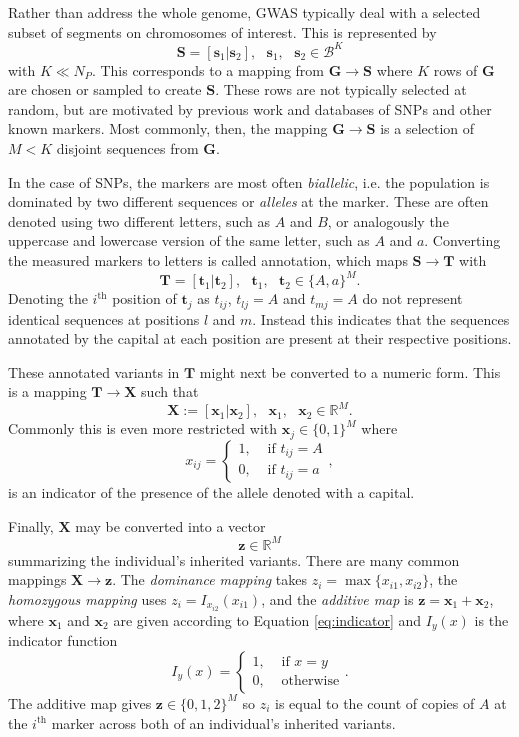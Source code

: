 \documentclass{article}
\newcommand{\ve}[1]{\mathbf{#1}}           %
\newcommand{\m}[1]{\mathbf{#1}}               %
\newcommand{\ind}[2]{I_{#2} \left( #1 \right)}
\newcommand{\field}[1]{\mathbb{#1}}
\newcommand{\Reals}{\field{R}}
\begin{document}
Rather than address the whole genome, GWAS typically deal with a selected subset of segments on chromosomes of interest. This is represented by
$$\m{S} = [\ve{s}_1 | \ve{s}_2], \text{ } \ve{s}_1, \text{ } \ve{s}_2 \in \mathcal{B}^K$$
with $K \ll N_P$. This corresponds to a mapping from $\m{G} \rightarrow \m{S}$ where $K$ rows of $\m{G}$ are chosen or sampled to create $\m{S}$. These rows are not typically selected at random, but are motivated by previous work and databases of SNPs and other known markers. Most commonly, then, the mapping $\m{G} \rightarrow \m{S}$ is a selection of $M < K$ disjoint sequences from $\m{G}$. 

In the case of SNPs, the markers are most often \textit{biallelic}, i.e. the population is dominated by two different sequences or \textit{alleles} at the marker. These are often denoted using two different letters, such as $A$ and $B$, or analogously the uppercase and lowercase version of the same letter, such as $A$ and $a$. Converting the measured markers to letters is called annotation, which maps $\m{S} \rightarrow \m{T}$ with
$$\m{T} = [\ve{t}_1 | \ve{t}_2], \text{ } \ve{t}_1, \text{ } \ve{t}_2 \in \{A,a\}^M.$$
Denoting the $i^{\text{th}}$ position of $\ve{t}_j$ as $t_{ij}$, $t_{lj} = A$ and $t_{mj} = A$ do not represent identical sequences at positions $l$ and $m$. Instead this indicates that the sequences annotated by the capital at each position are present at their respective positions.

These annotated variants in $\m{T}$ might next be converted to a numeric form. This is a mapping $\m{T} \rightarrow \m{X}$ such that
$$\m{X} := [\ve{x}_1 | \ve{x}_2], \text{ } \ve{x}_1, \text{ } \ve{x}_2 \in \Reals^M.$$
Commonly this is even more restricted with $\ve{x}_j \in \{0,1\}^M$ where
\begin{equation} \label{eq:indicator}
x_{ij} = \begin{cases}
  1, & \text{ if } t_{ij} = A \\
  0, & \text{ if } t_{ij} = a
\end{cases},
\end{equation}
is an indicator of the presence of the allele denoted with a capital.

Finally, $\m{X}$ may be converted into a vector
$$\ve{z} \in \Reals^M$$
summarizing the individual's inherited variants. There are many common mappings $\m{X} \rightarrow \ve{z}$. The \textit{dominance mapping} takes $z_i = \max\{x_{i1}, x_{i2}\}$, the \textit{homozygous mapping} uses $z_i = \ind{x_{i1}}{x_{i2}}$, and the \textit{additive map} is $\ve{z} = \ve{x}_1 + \ve{x}_2$, where $\ve{x}_1$ and $\ve{x}_2$ are given according to Equation \ref{eq:indicator} and $\ind{x}{y}$ is the indicator function
\begin{equation*}\ind{x}{y} = \begin{cases}
  1, & \text{ if } x = y \\
  0, & \text{ otherwise}
\end{cases}.\end{equation*} The additive map gives $\ve{z} \in \{0,1,2\}^M$ so $z_i$ is equal to the count of copies of $A$ at the $i^{\text{th}}$ marker across both of an individual's inherited variants.
\end{document}
